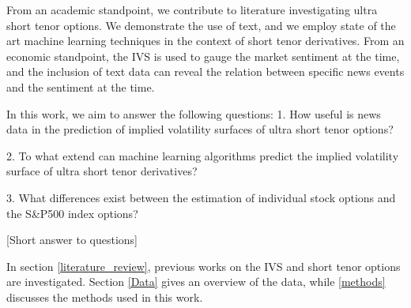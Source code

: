 






From an academic standpoint, we contribute to literature investigating ultra short tenor options. We demonstrate the use of text, and we employ state of the art machine learning techniques in the context of short tenor derivatives. From an economic standpoint, the IVS is used to gauge the market sentiment at the time, and the inclusion of text data can reveal the relation between specific news events and the sentiment at the time. 


In this work,  we aim to answer the following questions:
1. How useful is news data in the prediction of implied volatility surfaces of ultra short tenor options?

2. To what extend can machine learning algorithms predict the implied volatility surface of ultra short tenor derivatives?

3. What differences exist between the estimation of individual stock options and the S\&P500 index options?

[Short answer to questions]

In section \ref{literature_review}, previous works on the IVS and short tenor options are investigated. Section \ref{Data} gives an overview of the data, while \ref{methods} discusses the methods used in this work.  



